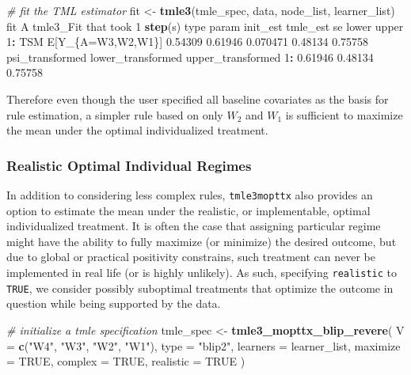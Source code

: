 \documentclass[12pt, krantz2,]{krantz}
\newenvironment{Shaded}{\begin{snugshade}}{\end{snugshade}}
\newcommand{\CommentTok}[1]{\textcolor[rgb]{0.37,0.37,0.37}{\textit{#1}}}
\newcommand{\DataTypeTok}[1]{\textcolor[rgb]{0.27,0.27,0.27}{#1}}
\newcommand{\DecValTok}[1]{\textcolor[rgb]{0.06,0.06,0.06}{#1}}
\newcommand{\FloatTok}[1]{\textcolor[rgb]{0.06,0.06,0.06}{#1}}
\newcommand{\KeywordTok}[1]{\textcolor[rgb]{0.27,0.27,0.27}{\textbf{#1}}}
\newcommand{\NormalTok}[1]{#1}
\newcommand{\OperatorTok}[1]{\textcolor[rgb]{0.43,0.43,0.43}{\textbf{#1}}}
\newcommand{\OtherTok}[1]{\textcolor[rgb]{0.37,0.37,0.37}{#1}}
\newcommand{\StringTok}[1]{\textcolor[rgb]{0.5,0.5,0.5}{#1}}
\theoremstyle{definition}
\theoremstyle{definition}
\theoremstyle{definition}
\newcommand{\1}{\mathbbm{1}}
\begin{document}
\begin{Shaded}
\begin{Highlighting}[]
\CommentTok{# fit the TML estimator}
\NormalTok{fit <-}\StringTok{ }\KeywordTok{tmle3}\NormalTok{(tmle_spec, data, node_list, learner_list)}
\NormalTok{fit}
\NormalTok{A tmle3_Fit that took }\DecValTok{1} \KeywordTok{step}\NormalTok{(s)}
\NormalTok{   type             param init_est tmle_est       se   lower   upper}
\DecValTok{1}\OperatorTok{:}\StringTok{  }\NormalTok{TSM E[Y_\{A=W3,W2,W1\}]  }\FloatTok{0.54309}  \FloatTok{0.61946} \FloatTok{0.070471} \FloatTok{0.48134} \FloatTok{0.75758}
\NormalTok{   psi_transformed lower_transformed upper_transformed}
\DecValTok{1}\OperatorTok{:}\StringTok{         }\FloatTok{0.61946}           \FloatTok{0.48134}           \FloatTok{0.75758}
\end{Highlighting}
\end{Shaded}

Therefore even though the user specified all baseline covariates as the basis
for rule estimation, a simpler rule based on only \(W_2\) and \(W_1\) is sufficient
to maximize the mean under the optimal individualized treatment.

\hypertarget{realistic-optimal-individual-regimes}{%
\subsubsection{Realistic Optimal Individual Regimes}\label{realistic-optimal-individual-regimes}}

In addition to considering less complex rules, \texttt{tmle3mopttx} also provides an
option to estimate the mean under the realistic, or implementable, optimal
individualized treatment. It is often the case that assigning particular regime
might have the ability to fully maximize (or minimize) the desired outcome, but
due to global or practical positivity constrains, such treatment can never be
implemented in real life (or is highly unlikely). As such, specifying
\texttt{realistic} to \texttt{TRUE}, we consider possibly suboptimal treatments that optimize
the outcome in question while being supported by the data.

\begin{Shaded}
\begin{Highlighting}[]
\CommentTok{# initialize a tmle specification}
\NormalTok{tmle_spec <-}\StringTok{ }\KeywordTok{tmle3_mopttx_blip_revere}\NormalTok{(}
  \DataTypeTok{V =} \KeywordTok{c}\NormalTok{(}\StringTok{"W4"}\NormalTok{, }\StringTok{"W3"}\NormalTok{, }\StringTok{"W2"}\NormalTok{, }\StringTok{"W1"}\NormalTok{), }\DataTypeTok{type =} \StringTok{"blip2"}\NormalTok{,}
  \DataTypeTok{learners =}\NormalTok{ learner_list,}
  \DataTypeTok{maximize =} \OtherTok{TRUE}\NormalTok{, }\DataTypeTok{complex =} \OtherTok{TRUE}\NormalTok{, }\DataTypeTok{realistic =} \OtherTok{TRUE}
\NormalTok{)}
\end{Highlighting}
\end{Shaded}
\end{document}
